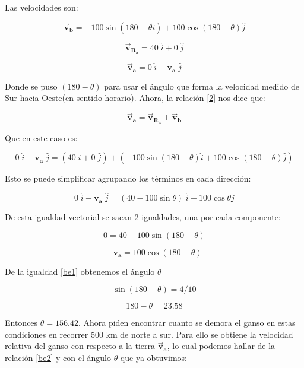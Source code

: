 \documentclass[a4paper,11pt]{article}
\theoremstyle{mytheor}
\begin{document}
Las velocidades son:

$$   \vec{\textbf{v}}_{\textbf{b}}  = -100 \sin (180-\theta \hat{i}) + 100\cos (180-\theta) \hat{j} $$

$$ \vec{\textbf{v}}_{\textbf{R}_\textbf{a}}  = 40\; \hat{i} + 0\; \hat{j}  $$

$$ \vec{\textbf{v}}_{\textbf{a}} = 0\; \hat{i} -\textbf{v}_{\textbf{a}} \; \hat{j}   $$

Donde se puso $(180-\theta)$ para usar el ángulo que forma la velocidad medido de Sur hacia Oeste(en sentido horario). Ahora, la relación \ref{2} nos dice que:



$$
\vec{\textbf{v}}_{\textbf{a}} = \vec{\textbf{v}}_{\textbf{R}_\textbf{a}} + \vec{\textbf{v}}_{\textbf{b}}$$


Que en este caso es:


$$
 0\; \hat{i}-\textbf{v}_{\textbf{a}} \; \hat{j}  = (40\; \hat{i}+ 0\; \hat{j} ) + (-100 \sin(180-\theta) \hat{i} + 100\cos(180-\theta) \hat{j})   
$$


Esto se puede simplificar agrupando los términos en cada dirección:


\begin{equation}
0\; \hat{i}-\textbf{v}_{\textbf{a}} \; \hat{j}  = (40 -100 \sin \theta)\; \hat{i} + 100\cos \theta \hat{j}   
\end{equation}

De esta igualdad vectorial se sacan 2 igualdades, una por cada componente:

\begin{equation}\label{be1}
0 = 40 -100 \sin (180-\theta)
\end{equation}

\begin{equation}\label{be2}
-\textbf{v}_{\textbf{a}} = 100\cos (180-\theta)
\end{equation}

De la igualdad \ref{be1} obtenemos el ángulo $\theta$

$$  \sin (180-\theta) = 4/10 $$ 

$$   180-\theta = 23.58 $$ 


Entonces $\theta= 156.42 $. Ahora piden encontrar cuanto se demora el ganso en estas condiciones en recorrer 500 km de norte a sur. Para ello se obtiene la velocidad relativa del ganso con respecto a la tierra  $\vec{\textbf{v}}_{\textbf{a}}$, lo cual podemos hallar de la relación \ref{be2} y con el ángulo $\theta$ que ya obtuvimos:
\end{document}
